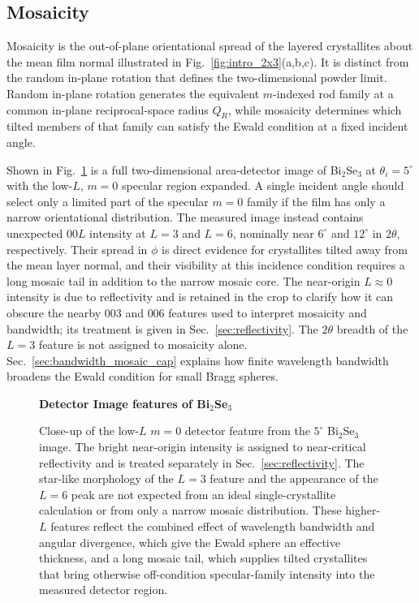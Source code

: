 \subsection{Mosaicity}
\label{sec:mosaicity}

Mosaicity is the out-of-plane orientational spread of the layered crystallites about the mean film normal illustrated in Fig.~\ref{fig:intro_2x3}(a,b,c). It is distinct from the random in-plane rotation that defines the two-dimensional powder limit. Random in-plane rotation generates the equivalent $m$-indexed rod family at a common in-plane reciprocal-space radius $Q_R$, while mosaicity determines which tilted members of that family can satisfy the Ewald condition at a fixed incident angle.

Shown in Fig.~\ref{fig:hk0_low_l_star} is a full two-dimensional area-detector image of Bi$_2$Se$_3$ at $\theta_i=5^\circ$ with the low-\(L\), \(m=0\) specular region expanded. A single incident angle should select only a limited part of the specular \(m=0\) family if the film has only a narrow orientational distribution. The measured image instead contains unexpected \(00L\) intensity at \(L=3\) and \(L=6\), nominally near \(6^\circ\) and \(12^\circ\) in \(2\theta\), respectively. Their spread in \(\phi\) is direct evidence for crystallites tilted away from the mean layer normal, and their visibility at this incidence condition requires a long mosaic tail in addition to the narrow mosaic core. The near-origin \(L\approx0\) intensity is due to reflectivity and is retained in the crop to clarify how it can obscure the nearby \(003\) and \(006\) features used to interpret mosaicity and bandwidth; its treatment is given in Sec.~\ref{sec:reflectivity}. The \(2\theta\) breadth of the \(L=3\) feature is not assigned to mosaicity alone. Sec.~\ref{sec:bandwidth_mosaic_cap} explains how finite wavelength bandwidth broadens the Ewald condition for small Bragg spheres.

\begin{figure}[H]
  \centering
  \textbf{Detector Image features of Bi$_2$Se$_3$}
  \begin{minipage}{0.8\linewidth}
    \centering
  \end{minipage}
  \caption{Close-up of the low-$L$ $m=0$ detector feature from the $5^\circ$ Bi$_2$Se$_3$ image. The bright near-origin intensity is assigned to near-critical reflectivity and is treated separately in Sec.~\ref{sec:reflectivity}. The star-like morphology of the \(L=3\) feature and the appearance of the \(L=6\) peak are not expected from an ideal single-crystallite calculation or from only a narrow mosaic distribution. These higher-\(L\) features reflect the combined effect of wavelength bandwidth and angular divergence, which give the Ewald sphere an effective thickness, and a long mosaic tail, which supplies tilted crystallites that bring otherwise off-condition specular-family intensity into the measured detector region.}
  \label{fig:hk0_low_l_star}
\end{figure}

